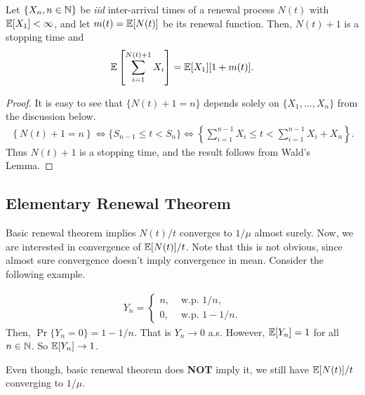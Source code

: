 \documentclass[a4paper,10pt, english]{article}
\begin{document}
\begin{prop} \label{prop:WaldRenewal}
	Let $\{X_n, n \in \mathbb{N}\}$ be \textit{iid} inter-arrival times of a renewal process $N(t)$ with $\mathbb{E}[X_1] < \infty$, and let $m(t) = \mathbb{E}[N(t)]$ be its renewal function. Then, $N(t)+1$ is a stopping time and 
	\begin{align*}
	\mathbb{E}\left[\sum_{i=1}^{N(t)+1}X_i\right] = \mathbb{E}[X_1][1+m(t)].
	\end{align*}
\end{prop}
\begin{proof} It is easy to see that $\{N(t)+1=n\}$ depends solely on $\{X_1,\ldots,X_n\}$ from the discussion below.
	\begin{align*}
	\left\{N(t) + 1 = n \right\} \iff \{S_{n-1} \leq t < S_n\} \iff \left\{\sum_{i=1}^{n-1} X_i \leq t < \sum_{i=1}^{n-1} X_i + X_n\right\}.
	\end{align*}
	Thus $N(t)+1$ is a stopping time, and the result follows from Wald's Lemma.
\end{proof}

\subsection{Elementary Renewal Theorem}
Basic renewal theorem implies $N(t)/t$ converges to $1/\mu$ almost surely. Now, we are interested in convergence of $\mathbb{E}[N(t)]/t$. Note that this is not obvious, since almost sure convergence doesn't imply convergence in mean. Consider the following example.
\begin{exmp}
	\begin{align*}
	Y_n = \begin{cases}
	n, & \mbox{ w.p.  } 1/n,\\
	0, & \mbox{ w.p.  } 1- 1/n.
	\end{cases}
	\end{align*}
	Then, $\Pr\{ Y_n = 0 \} = 1 - 1/n$. %
	That is $Y_n \to 0$ a.s. However, $\mathbb{E}[Y_n] = 1$ for all $n \in \mathbb{N}$. So $\mathbb{E}[Y_n] \to 1$.
\end{exmp}
Even though, basic renewal theorem does \textbf{NOT} imply it, we still have $\mathbb{E}[N(t)]/t$ converging to $1/\mu$.
\end{document}
